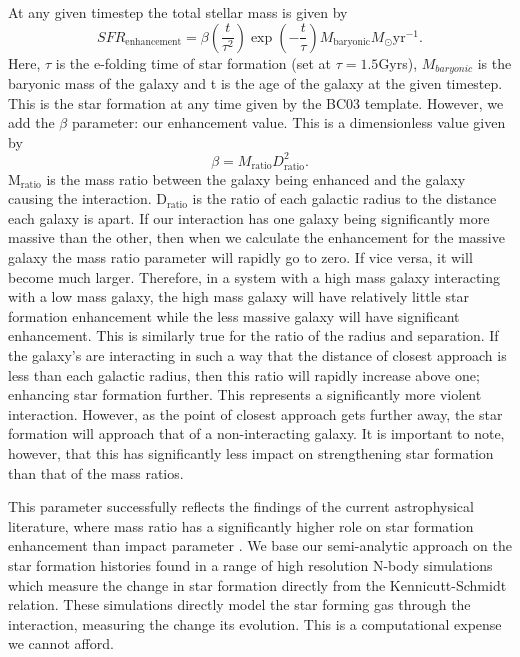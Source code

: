 At any given timestep the total stellar mass is given by
\begin{equation}\label{Total_SFR}
    SFR_{\text{enhancement}} = \beta (\frac{t}{\tau^{2}}) \exp(-\frac{t}{\tau}) M_{\text{baryonic}} M_{\odot} \text{yr}^{-1}.
\end{equation}
Here, $\tau$ is the e-folding time of star formation (set at $\tau = 1.5$Gyrs), $M_{baryonic}$ is the baryonic mass of the galaxy and t is the age of the galaxy at the given timestep. This is the star formation at any time given by the BC03 template. However, we add the $\beta$ parameter: our enhancement value. This is a dimensionless value given by
\begin{equation}\label{enhancement_param}
    \beta = M_{\text{ratio}} D_{\text{ratio}}^{2}.
\end{equation}
M$_{\text{ratio}}$ is the mass ratio between the galaxy being enhanced and the galaxy causing the interaction. D$_{\text{ratio}}$ is the ratio of each galactic radius to the distance each galaxy is apart. If our interaction has one galaxy being significantly more massive than the other, then when we calculate the enhancement for the massive galaxy the mass ratio parameter will rapidly go to zero. If vice versa, it will become much larger. Therefore, in a system with a high mass galaxy interacting with a low mass galaxy, the high mass galaxy will have relatively little star formation enhancement while the less massive galaxy will have significant enhancement. This is similarly true for the ratio of the radius and separation. If the galaxy's are interacting in such a way that the distance of closest approach is less than each galactic radius, then this ratio will rapidly increase above one; enhancing star formation further. This represents a significantly more violent interaction. However, as the point of closest approach gets further away, the star formation will approach that of a non-interacting galaxy. It is important to note, however, that this has significantly less impact on strengthening star formation than that of the mass ratios. 

This parameter successfully reflects the findings of the current astrophysical literature, where mass ratio has a significantly higher role on star formation enhancement than impact parameter \citep{2003ApJ...582..668B, 2008MNRAS.391.1137L, 2008MNRAS.385.1903L}. We base our semi-analytic approach on the star formation histories found in a range of high resolution N-body simulations \citep{1996ApJ...464..641M, 2000MNRAS.312..859S, 2019MNRAS.490.2139R} which measure the change in star formation directly from the Kennicutt-Schmidt \citep{1998ApJ...498..541K} relation. These simulations directly model the star forming gas through the interaction, measuring the change its evolution. This is a computational expense we cannot afford.

